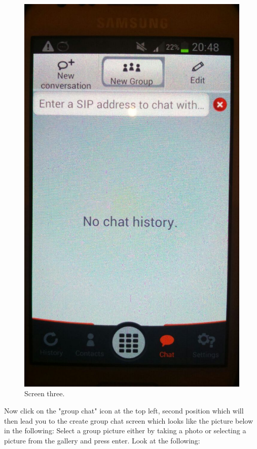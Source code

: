 \documentclass[a4paper]{article}
\begin{document}
\begin{center}
\begin{figure}[H]
\centering

\includegraphics[width=0.4\linewidth]{pictures/s1.jpg}
\caption{\label{fig:Screen3}Screen three.}
\end{figure}
\end{center}

Now click on the "group chat" icon at the top left, second position which will then lead you to the create group chat screen which looks like the picture below in the following:
%
%
Select a group picture either by taking a photo or selecting a picture from the gallery and press enter. Look at the following:
\end{document}
